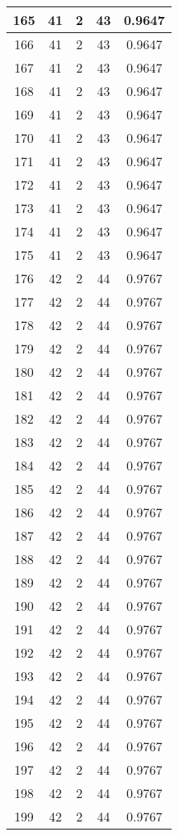 \documentclass[letterpaper, 12pt]{article}
\begin{document}
\begin{longtable}{|c|c|c|c|c|}
\hline
165 & 41 & 2 & 43 & 0.9647 \\
\hline
166 & 41 & 2 & 43 & 0.9647 \\
\hline
167 & 41 & 2 & 43 & 0.9647 \\
\hline
168 & 41 & 2 & 43 & 0.9647 \\
\hline
169 & 41 & 2 & 43 & 0.9647 \\
\hline
170 & 41 & 2 & 43 & 0.9647 \\
\hline
171 & 41 & 2 & 43 & 0.9647 \\
\hline
172 & 41 & 2 & 43 & 0.9647 \\
\hline
173 & 41 & 2 & 43 & 0.9647 \\
\hline
174 & 41 & 2 & 43 & 0.9647 \\
\hline
175 & 41 & 2 & 43 & 0.9647 \\
\hline
176 & 42 & 2 & 44 & 0.9767 \\
\hline
177 & 42 & 2 & 44 & 0.9767 \\
\hline
178 & 42 & 2 & 44 & 0.9767 \\
\hline
179 & 42 & 2 & 44 & 0.9767 \\
\hline
180 & 42 & 2 & 44 & 0.9767 \\
\hline
181 & 42 & 2 & 44 & 0.9767 \\
\hline
182 & 42 & 2 & 44 & 0.9767 \\
\hline
183 & 42 & 2 & 44 & 0.9767 \\
\hline
184 & 42 & 2 & 44 & 0.9767 \\
\hline
185 & 42 & 2 & 44 & 0.9767 \\
\hline
186 & 42 & 2 & 44 & 0.9767 \\
\hline
187 & 42 & 2 & 44 & 0.9767 \\
\hline
188 & 42 & 2 & 44 & 0.9767 \\
\hline
189 & 42 & 2 & 44 & 0.9767 \\
\hline
190 & 42 & 2 & 44 & 0.9767 \\
\hline
191 & 42 & 2 & 44 & 0.9767 \\
\hline
192 & 42 & 2 & 44 & 0.9767 \\
\hline
193 & 42 & 2 & 44 & 0.9767 \\
\hline
194 & 42 & 2 & 44 & 0.9767 \\
\hline
195 & 42 & 2 & 44 & 0.9767 \\
\hline
196 & 42 & 2 & 44 & 0.9767 \\
\hline
197 & 42 & 2 & 44 & 0.9767 \\
\hline
198 & 42 & 2 & 44 & 0.9767 \\
\hline
199 & 42 & 2 & 44 & 0.9767 \\
\hline
\end{longtable}
\end{document}
